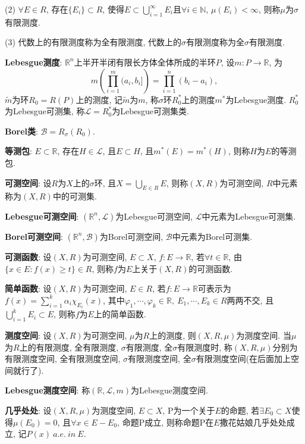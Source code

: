 \documentclass[12pt, a4paper, oneside]{ctexart}
\let\geq=\geqslant %
\def\R{\mathbb{R}}          %
\def\N{\mathbb{N}}          %
\def\L{\mathcal{L}}         %
\begin{document}
(2) $\forall E\in R$, 存在$\{E_i\}\subset R$, 使得$E\subset \bigcup_{i=1}^\infty E_i$且$\forall i\in \N$, $\mu(E_i) < \infty$, 则称$\mu$为$\sigma$有限测度.

(3) 代数上的有限测度称为全有限测度, 代数上的$\sigma$有限测度称为全$\sigma$有限测度.

\textbf{Lebesgue测度}: $\R^n$上半开半闭有限长方体全体所成的半环$P$, 设$m:P\to \R$, 为
\begin{equation*}
    m\left(\prod_{i=1}^m(a_i, b_i]\right) = \prod_{i=1}^n(b_i-a_i),
\end{equation*}
$\tilde{m}$为环$R_0 = R(P)$上的测度, 记$\tilde{m}$为$m$, 称$\sigma$环$R_0^*$上的测度$m^*$为Lebesgue测度. $R_0^*$为Lebesgue可测集, 称$\mathcal{L} = R_0^*$为Lebesgue可测集类.

\def\B{\mathcal{B}}

\textbf{Borel类}: $\B = R_{\sigma}(R_0)$.

\textbf{等测包}: $E\subset \R$, 存在$H\in \L$, 且$E\subset H$, 且$m^*(E) = m^*(H)$, 则称$H$为$E$的等测包.

\textbf{可测空间}: 设$R$为$X$上的$\sigma$环, 且$X=\bigcup_{E\in R}E$, 则称$(X, R)$为可测空间, $R$中元素称为$(X, R)$中的可测集.

\textbf{Lebesgue可测空间}: $(\R^n, \L)$为Lebesgue可测空间, $\L$中元素为Lebesgue可测集.

\textbf{Borel可测空间}: $(\R^n, \B)$为Borel可测空间, $\B$中元素为Borel可测集.

\textbf{可测函数}: 设$(X, R)$为可测空间, $E\subset X$, $f:E\to\R$, 若$\forall t\in \R$, 由$\{x\in E:f(x)\geq t\}\in R$, 则称$f$为$E$上关于$(X, R)$的可测函数.

\textbf{简单函数}: 设$(X, R)$为可测空间, $E\in R$, 若$f:E\to \R$可表示为$f(x) = \sum_{i=1}^k\alpha_i\chi_{E_i}(x)$, 其中$\varphi_1,\cdots, \varphi_k\in \R,\ E_1,\cdots, E_k\in R$两两不交, 且$\bigcup_{i=1}^kE_i\subset E$, 则称$f$为$E$上的简单函数.

\textbf{测度空间}: 设$(X, R)$为可测空间, $\mu$为$R$上的测度, 则$(X, R,\mu)$为测度空间. 当$\mu$为$R$上的有限测度, 全有限测度, $\sigma$有限测度, 全$\sigma$有限测度时, 称$(X, R, \mu)$分别为有限测度空间, 全有限测度空间, $\sigma$有限测度空间, 全$\sigma$有限测度空间(在后面加上空间就行了).

\textbf{Lebesgue测度空间}: 称$(\R, \L, m)$为Lebesgue测度空间.

\textbf{几乎处处}: 设$(X, R, \mu)$为测度空间, $E\subset X$, P为一个关于$E$的命题, 若$\exists E_0\subset X$使得$\mu(E_0) = 0$, 且$\forall x\in E-E_0$, 命题P成立, 则称命题P在$E$撒花姑娘几乎处处成立, 记$P(x)\ a.e.\ in\ E$.
\end{document}
